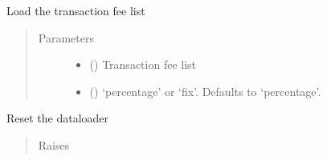 \documentclass[letterpaper,10pt,english]{sphinxmanual}
\begin{document}
\begin{fulllineitems}
\begin{fulllineitems}
\label{\detokenize{DataLoader:crypto_env.dataloader.DataLoader.idx}}
\end{fulllineitems}


\begin{fulllineitems}
\label{\detokenize{DataLoader:crypto_env.dataloader.DataLoader.load_transaction_fee}}
\sphinxAtStartPar
Load the transaction fee list
\begin{quote}\begin{description}
\item[{Parameters}] \leavevmode\begin{itemize}
\item {} 
\sphinxAtStartPar
{} () \textendash{} Transaction fee list

\item {} 
\sphinxAtStartPar
{} (\sphinxstyleliteralemphasis{\sphinxupquote{, }}) \textendash{} ‘percentage’ or ‘fix’. Defaults to ‘percentage’.

\end{itemize}

\end{description}\end{quote}

\end{fulllineitems}


\begin{fulllineitems}
\label{\detokenize{DataLoader:crypto_env.dataloader.DataLoader.reset}}
\sphinxAtStartPar
Reset the dataloader
\begin{quote}\begin{description}
\item[{Raises}] \leavevmode
\sphinxAtStartPar
{} \textendash{} 

\end{description}\end{quote}

\end{fulllineitems}


\end{fulllineitems}
\end{document}
